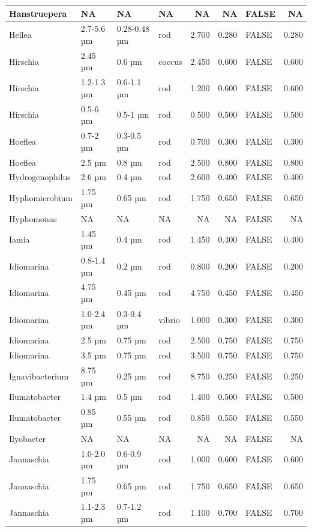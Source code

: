 \documentclass[
]{article}
\begin{document}
\begin{table}
\begin{tabular}{l|l|l|l|r|r|l|r}
\hline
Hanstruepera & NA & NA & NA & NA & NA & FALSE & NA\\
\hline
Hellea & 2.7-5.6 µm & 0.28-0.48 µm & rod & 2.700 & 0.280 & FALSE & 0.280\\
\hline
Hirschia & 2.45 µm & 0.6 µm & coccus & 2.450 & 0.600 & FALSE & 0.600\\
\hline
Hirschia & 1.2-1.3 µm & 0.6-1.1 µm & rod & 1.200 & 0.600 & FALSE & 0.600\\
\hline
Hirschia & 0.5-6 µm & 0.5-1 µm & rod & 0.500 & 0.500 & FALSE & 0.500\\
\hline
Hoeflea & 0.7-2 µm & 0.3-0.5 µm & rod & 0.700 & 0.300 & FALSE & 0.300\\
\hline
Hoeflea & 2.5 µm & 0.8 µm & rod & 2.500 & 0.800 & FALSE & 0.800\\
\hline
Hydrogenophilus & 2.6 µm & 0.4 µm & rod & 2.600 & 0.400 & FALSE & 0.400\\
\hline
Hyphomicrobium & 1.75 µm & 0.65 µm & rod & 1.750 & 0.650 & FALSE & 0.650\\
\hline
Hyphomonas & NA & NA & NA & NA & NA & FALSE & NA\\
\hline
Iamia & 1.45 µm & 0.4 µm & rod & 1.450 & 0.400 & FALSE & 0.400\\
\hline
Idiomarina & 0.8-1.4 µm & 0.2 µm & rod & 0.800 & 0.200 & FALSE & 0.200\\
\hline
Idiomarina & 4.75 µm & 0.45 µm & rod & 4.750 & 0.450 & FALSE & 0.450\\
\hline
Idiomarina & 1.0-2.4 µm & 0.3-0.4 µm & vibrio & 1.000 & 0.300 & FALSE & 0.300\\
\hline
Idiomarina & 2.5 µm & 0.75 µm & rod & 2.500 & 0.750 & FALSE & 0.750\\
\hline
Idiomarina & 3.5 µm & 0.75 µm & rod & 3.500 & 0.750 & FALSE & 0.750\\
\hline
Ignavibacterium & 8.75 µm & 0.25 µm & rod & 8.750 & 0.250 & FALSE & 0.250\\
\hline
Ilumatobacter & 1.4 µm & 0.5 µm & rod & 1.400 & 0.500 & FALSE & 0.500\\
\hline
Ilumatobacter & 0.85 µm & 0.55 µm & rod & 0.850 & 0.550 & FALSE & 0.550\\
\hline
Ilyobacter & NA & NA & NA & NA & NA & FALSE & NA\\
\hline
Jannaschia & 1.0-2.0 µm & 0.6-0.9 µm & rod & 1.000 & 0.600 & FALSE & 0.600\\
\hline
Jannaschia & 1.75 µm & 0.65 µm & rod & 1.750 & 0.650 & FALSE & 0.650\\
\hline
Jannaschia & 1.1-2.3 µm & 0.7-1.2 µm & rod & 1.100 & 0.700 & FALSE & 0.700\\

\end{tabular}
\end{table}
\end{document}
